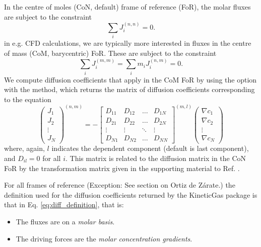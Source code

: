 In the centre of moles (CoN, default) frame of reference (FoR), the molar fluxes are subject to the constraint
\begin{equation}
    \sum_i J_i^{(n, n)} = 0.
\end{equation}
in e.g. CFD calculations, we are typically more interested in fluxes in the centre of mass (CoM, barycentric) FoR. These are subject to the constraint
\begin{equation}
    \sum_i J_i^{(m, m)} = \sum_i m_i J_i^{(n, m)} = 0.
\end{equation}
We compute diffusion coefficients that apply in the CoM FoR by using the option  with the  method, which returns the matrix of diffusion coefficients corresponding to the equation
\begin{equation}
    \begin{pmatrix}J_1 \\ J_2 \\ \vdots \\ J_N \end{pmatrix}^{(n, m)} = -
    \begin{bmatrix}
    D_{11} & D_{12} & \hdots & D_{1N} \\
    D_{21} & D_{22} & \hdots & D_{2N} \\
    \vdots & \vdots & \ddots & \vdots \\
    D_{N1} & D_{N2} & \hdots & D_{NN}
    \end{bmatrix}^{(m, l)}
    \begin{pmatrix}\nabla c_1 \\ \nabla c_2 \\ \vdots \\ \nabla c_N \end{pmatrix}
\end{equation}
where, again, $l$ indicates the dependent component (default is last component), and $D_{il} = 0$ for all $i$. This matrix is related to the diffusion matrix in the CoN FoR by the transformation matrix given in the supporting material to Ref. \cite{retmie}.

For all frames of reference (Exception: See section on Ortiz de Zárate.) the definition used for the diffusion coefficients returned by the KineticGas package is that in Eq. \eqref{eq:diff_definition}, that is:
\begin{itemize}
    \item The fluxes are on a \textit{molar basis}.
    \item The driving forces are the \textit{molar concentration gradients}.
\end{itemize}

